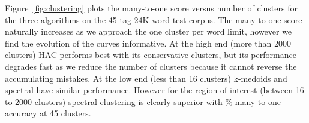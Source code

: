 Figure~\ref{fig:clustering} plots the many-to-one score versus number
of clusters for the three algorithms on the 45-tag 24K word test
corpus.  The many-to-one score naturally increases as we approach the
one cluster per word limit, however we find the evolution of the
curves informative.  At the high end (more than 2000 clusters) HAC
performs best with its conservative clusters, but its performance
degrades fast as we reduce the number of clusters because it cannot
reverse the accumulating mistakes.  At the low end (less than 16
clusters) k-medoids and spectral have similar performance.  However
for the region of interest (between 16 to 2000 clusters) spectral
clustering is clearly superior with \spectralResult\% many-to-one
accuracy at 45 clusters.



